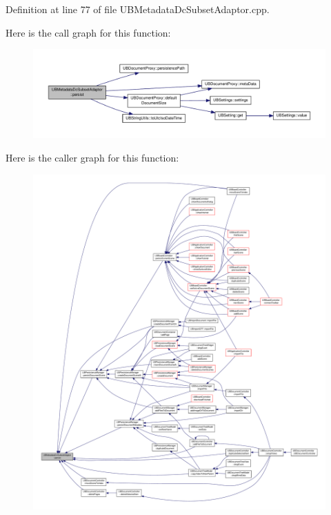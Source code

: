 Definition at line 77 of file U\-B\-Metadata\-Dc\-Subset\-Adaptor.\-cpp.



Here is the call graph for this function\-:
\nopagebreak
\begin{figure}[H]
\begin{center}
\leavevmode
\includegraphics[width=350pt]{dc/d51/class_u_b_metadata_dc_subset_adaptor_a39cfa5435d5166fe515da61200777e45_cgraph}
\end{center}
\end{figure}




Here is the caller graph for this function\-:
\nopagebreak
\begin{figure}[H]
\begin{center}
\leavevmode
\includegraphics[width=350pt]{dc/d51/class_u_b_metadata_dc_subset_adaptor_a39cfa5435d5166fe515da61200777e45_icgraph}
\end{center}
\end{figure}




